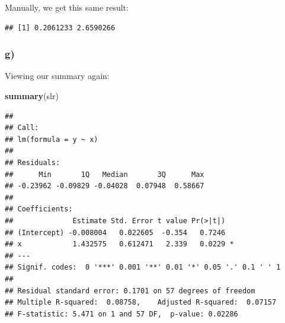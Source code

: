 \documentclass[
]{article}
\newenvironment{Shaded}{\begin{snugshade}}{\end{snugshade}}
\newcommand{\DecValTok}[1]{\textcolor[rgb]{0.00,0.00,0.81}{#1}}
\newcommand{\FloatTok}[1]{\textcolor[rgb]{0.00,0.00,0.81}{#1}}
\newcommand{\FunctionTok}[1]{\textcolor[rgb]{0.13,0.29,0.53}{\textbf{#1}}}
\newcommand{\NormalTok}[1]{#1}
\newcommand{\OtherTok}[1]{\textcolor[rgb]{0.56,0.35,0.01}{#1}}
\newcommand{\SpecialCharTok}[1]{\textcolor[rgb]{0.81,0.36,0.00}{\textbf{#1}}}
\begin{document}
Manually, we get this same result:

\begin{Shaded}
\end{Shaded}

\begin{verbatim}
## [1] 0.2061233 2.6590266
\end{verbatim}

\subsubsection{g)}\label{g}

Viewing our summary again:

\begin{Shaded}
\begin{Highlighting}[]
\FunctionTok{summary}\NormalTok{(slr)}
\end{Highlighting}
\end{Shaded}

\begin{verbatim}
## 
## Call:
## lm(formula = y ~ x)
## 
## Residuals:
##      Min       1Q   Median       3Q      Max 
## -0.23962 -0.09829 -0.04028  0.07948  0.58667 
## 
## Coefficients:
##              Estimate Std. Error t value Pr(>|t|)  
## (Intercept) -0.008004   0.022605  -0.354   0.7246  
## x            1.432575   0.612471   2.339   0.0229 *
## ---
## Signif. codes:  0 '***' 0.001 '**' 0.01 '*' 0.05 '.' 0.1 ' ' 1
## 
## Residual standard error: 0.1701 on 57 degrees of freedom
## Multiple R-squared:  0.08758,    Adjusted R-squared:  0.07157 
## F-statistic: 5.471 on 1 and 57 DF,  p-value: 0.02286
\end{verbatim}
\end{document}

